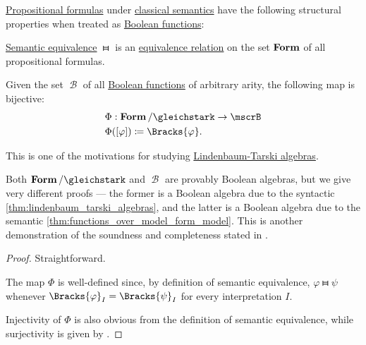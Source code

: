 \begin{proposition}\label{thm:propositional_formulas_and_boolean_functions}
  \hyperref[def:propositional_syntax/formula]{Propositional formulas} under \hyperref[def:propositional_semantics/classical]{classical semantics} have the following structural properties when treated as \hyperref[def:boolean_function]{Boolean functions}:

  \begin{thmenum}
     \hyperref[def:semantic_equivalence]{Semantic equivalence} \( \gleichstark \) is an \hyperref[def:equivalence_relation]{equivalence relation} on the set \( \op*{Form} \) of all propositional formulas.

     Given the set \( \mscrB \) of all \hyperref[def:boolean_function]{Boolean functions} of arbitrary arity, the following map is bijective:
    \begin{equation*}
      \begin{aligned}
        &\Phi: \op*{Form} / {\gleichstark} \to \mscrB \\
        &\Phi([\varphi]) \coloneqq \Bracks{\varphi}.
      \end{aligned}
    \end{equation*}
  \end{thmenum}
\end{proposition}
\begin{comments}
  \item This is one of the motivations for studying \hyperref[def:lindenbaum_tarski_algebra]{Lindenbaum-Tarski algebras}.
  \item Both \( \op*{Form} / {\gleichstark} \) and \( \mscrB \) are provably Boolean algebras, but we give very different proofs --- the former is a Boolean algebra due to the syntactic \cref{thm:lindenbaum_tarski_algebras}, and the latter is a Boolean algebra due to the semantic \cref{thm:functions_over_model_form_model}. This is another demonstration of the soundness and completeness stated in .
\end{comments}
\begin{proof}
   Straightforward.

   The map \( \Phi \) is well-defined since, by definition of semantic equivalence, \( \varphi \gleichstark \psi \) whenever \( \Bracks{\varphi}_I = \Bracks{\psi}_I \) for every interpretation \( I \).

  Injectivity of \( \Phi \) is also obvious from the definition of semantic equivalence, while surjectivity is given by .
\end{proof}
